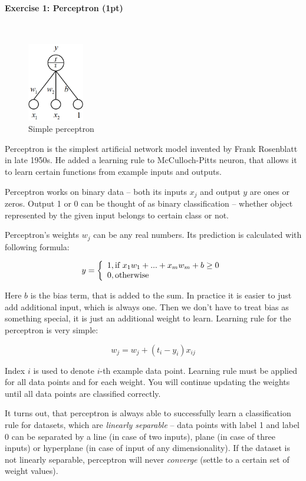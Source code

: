 \documentclass[a4paper,11pt]{article}
\newenvironment{exercise}[3]{\paragraph{Exercise #1: #2 (#3pt)}\ \\}{
\medskip}
\begin{document}
%
%
\begin{exercise}{1}{Perceptron}{1}

\begin{figure}
	\centering
	\vspace{-12pt}
	\includegraphics[width=0.22\textwidth]{perceptron.png}
	\caption{Simple perceptron}
	\label{fig:perceptronexample}
	\vspace{-5pt}
\end{figure}

Perceptron is the simplest artificial network model invented by Frank Rosenblatt in late 1950s. He added a learning rule to McCulloch-Pitts neuron, that allows it to learn certain functions from example inputs and outputs.

Perceptron works on binary data – both its inputs $x_j$ and output $y$ are ones or zeros. Output 1 or 0 can be thought of as binary classification – whether object represented by the given input belongs to certain class or not. 

Perceptron’s weights $w_j$ can be any real numbers. Its prediction is calculated with following formula:

$$
y = \left\{
	\begin{array}{l l}
		1, \text{if } x_1 w_1 + ... + x_m w_m + b \geq 0\\
		0, \text{otherwise}
	\end{array}
	\right.
$$

Here $b$ is the bias term, that is added to the sum. In practice it is easier to just add additional input, which is always one. Then we don’t have to treat bias as something special, it is just an additional weight to learn. Learning rule for the perceptron is very simple:

$$
w_j = w_j + (t_i - y_i) x_{ij}
$$

Index $i$ is used to denote $i$-th example data point. Learning rule must be applied for all data points and for each weight. You will continue updating the weights until all data points are classified correctly.

It turns out, that perceptron is always able to successfully learn a classification rule for datasets, which are \textit{linearly separable} -- data points with label 1 and label 0 can be separated by a line (in case of two inputs), plane (in case of three inputs) or hyperplane (in case of input of any dimensionality). If the dataset is not linearly separable, perceptron will never \textit{converge} (settle to a certain set of weight values). \newline


\end{exercise}
\end{document}
